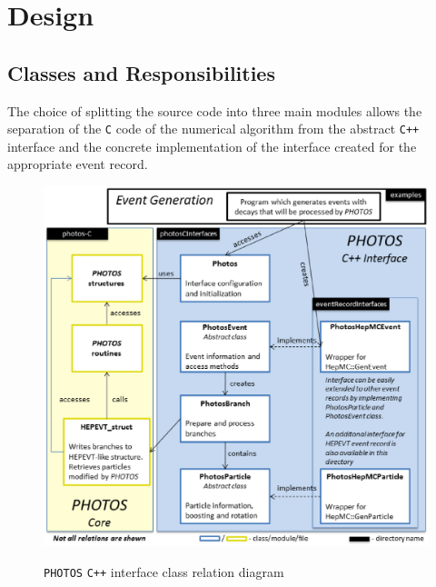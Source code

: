 \documentclass[]{Photos_interface_design}
\begin{document}
\section{Design}
\label{sec:design}
\subsection{Classes and Responsibilities}

The choice of splitting the source code into three main modules
 allows the separation of the {\tt C}  code of the numerical algorithm from the abstract {\tt C++} interface
and the concrete implementation of the interface created for the appropriate
event record.

\begin{figure}[h!]
\centering
\includegraphics[scale=0.5]{interface_design.eps}
\label{fig:design}
\caption{{\tt PHOTOS} {\tt C++} interface class relation diagram}
\end{figure}
\end{document}
